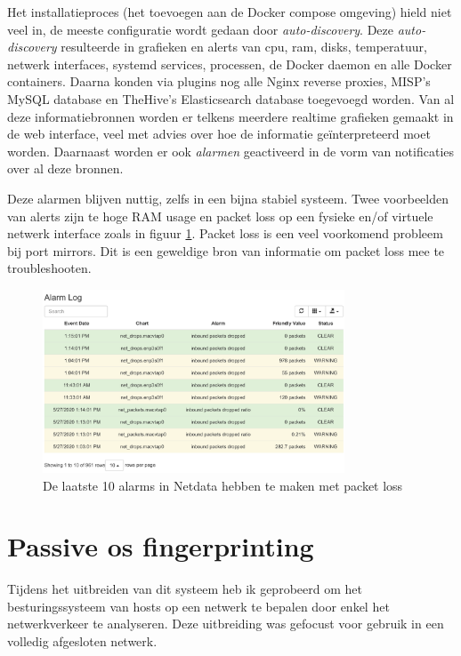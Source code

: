 \documentclass[a4paper, 12pt]{report}
\begin{document}
Het installatieproces (het toevoegen aan de Docker compose omgeving) hield niet veel in, de meeste configuratie wordt gedaan door \emph{auto-discovery}.
Deze \emph{auto-discovery} resulteerde in grafieken en alerts van cpu, ram, disks, temperatuur, netwerk interfaces, systemd services, processen, de Docker daemon en alle Docker containers.
Daarna konden via plugins nog alle Nginx reverse proxies, MISP's MySQL database en TheHive's Elasticsearch database toegevoegd worden.
Van al deze informatiebronnen worden er telkens meerdere realtime grafieken gemaakt in de web interface, veel met advies over hoe de informatie geïnterpreteerd moet worden.
Daarnaast worden er ook \emph{alarmen} geactiveerd in de vorm van notificaties over al deze bronnen.

Deze alarmen blijven nuttig, zelfs in een bijna stabiel systeem.
Twee voorbeelden van alerts zijn te hoge RAM usage en packet loss op een fysieke en/of virtuele netwerk interface zoals in figuur \ref{fig:netdata-packet-loss}.
Packet loss is een veel voorkomend probleem bij port mirrors.
Dit is een geweldige bron van informatie om packet loss mee te troubleshooten.

\begin{figure}[H]
  \centering
  \includegraphics[width=0.8\textwidth]{netdata-packet-loss}
  \caption{De laatste 10 alarms in Netdata hebben te maken met packet loss}
  \label{fig:netdata-packet-loss}
\end{figure}

\section{Passive os fingerprinting}
Tijdens het uitbreiden van dit systeem heb ik geprobeerd om het besturingssysteem van hosts op een netwerk te bepalen door enkel het netwerkverkeer te analyseren.
Deze uitbreiding was gefocust voor gebruik in een volledig afgesloten netwerk.
\end{document}

